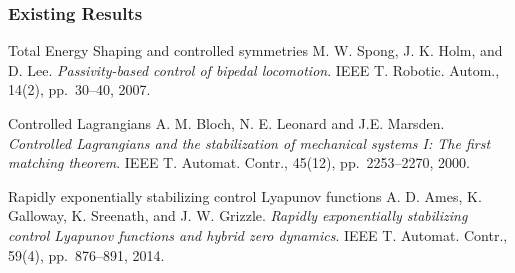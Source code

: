 \begin{frame}[t]
  \frametitle{Existing Results}
  \begin{block}{Total Energy Shaping and controlled symmetries}
    \small
    M. W. Spong, J. K. Holm, and D. Lee. {\em Passivity-based control of
      bipedal locomotion}. IEEE T. Robotic. Autom., 14(2), pp.~30--40,
    2007.
  \end{block}
  \begin{block}{Controlled Lagrangians}
    \small
    A. M. Bloch, N. E. Leonard and J.E. Marsden. {\em Controlled Lagrangians
      and the stabilization of mechanical systems I: The first matching
      theorem}. IEEE T. Automat. Contr., 45(12), pp.~2253--2270, 2000.
  \end{block}
  \begin{block}{Rapidly exponentially stabilizing control Lyapunov functions}
    \small
    A. D. Ames, K. Galloway, K. Sreenath, and J. W. Grizzle. {\em Rapidly
    exponentially stabilizing control Lyapunov functions and hybrid zero
    dynamics}. IEEE T. Automat. Contr., 59(4), pp.~876--891, 2014.
  \end{block}

\end{frame}